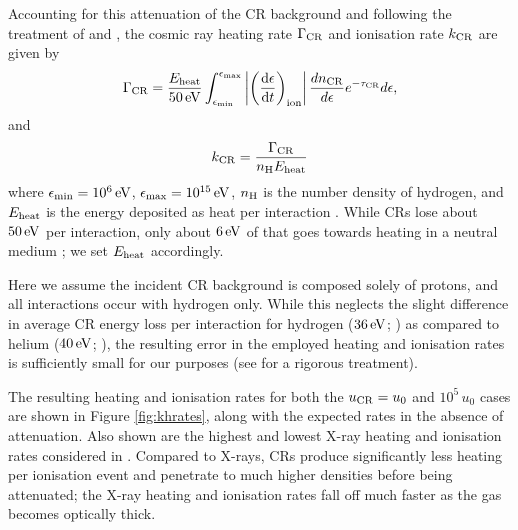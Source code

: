 \documentclass[usenatbib]{mn2e}
\newcommand{\ev}{\,{\rm eV}}
\newcommand{\ucr}{{u}_{\rm \small CR}}
\begin{document}
Accounting for this attenuation of the CR background and following the treatment of \citet{StacyBromm2007} and \citet{InayoshiOmukai2011}, the cosmic ray heating rate $\Gamma_{\rm \small CR}$ and ionisation rate $k_{\rm \small CR}$ are given by
\begin{equation}
\Gamma_{\rm \small CR} = 
    \frac{ E_{\rm \small heat}}{50\,{\rm \small eV}} 
    \int_{\epsilon_{\rm min}}^{\epsilon_{\rm max}} 
    \left| \left( \frac{{\rm d}\epsilon} {{\rm d}t} \right)_{\rm ion} \right|
    \frac{dn_{\rm \tiny CR}}{d\epsilon} e^{-\tau_{\rm \small CR}} d\epsilon,
\end{equation}
and 
\begin{equation}
k_{\rm \small CR} = \frac{\Gamma_{\rm \small CR}}{ n_{\rm \small H} E_{\rm \small heat}}
\end{equation}
where $\epsilon_{\rm min} = 10^6\ev$, $\epsilon_{\rm max}= 10^{15}\ev$, $n_{\rm \small H}$ is the number density of hydrogen, and $E_{\rm \small heat}$ is the energy deposited as heat per interaction \citep{Schlickeiser2002}.
While CRs lose about $50\ev$ per interaction, only about $6\ev$ of that goes towards heating in a neutral medium \citep{SpitzerScott1969,ShullvanSteenberg1985}; we set $E_{\rm \small heat}$ accordingly.

Here we assume the incident CR background is composed solely of protons, and all interactions occur with hydrogen only.  
While this neglects the slight difference in average CR energy loss per interaction for hydrogen ($36\ev$; \citealt{BakkerSegre1951}) as compared to helium ($40\ev$; \citealt{WeissBernstein1956}), the resulting error in the employed heating and ionisation rates is sufficiently small for our purposes (see \citealt{JascheCiardiEnsslin2007} for a rigorous treatment). 

The resulting heating and ionisation rates for both the $\ucr=u_0$ and $10^5\,u_0$ cases are shown in Figure \ref{fig:khrates}, along with the expected rates in the absence of attenuation.
Also shown are the highest and lowest X-ray heating and ionisation rates considered in \citet{Hummeletal2015}. 
Compared to X-rays, CRs produce significantly less heating per ionisation event and penetrate to much higher densities before being attenuated; the X-ray heating and ionisation rates fall off much faster as the gas becomes optically thick.
\end{document}
